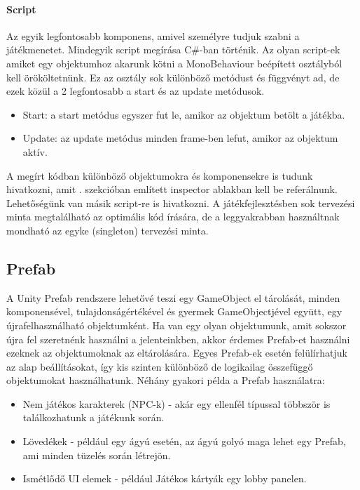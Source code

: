 \documentclass[]{thesis-ekf}
\theoremstyle{definition}
\theoremstyle{remark}
\begin{document}
\paragraph{Script}

Az egyik legfontosabb komponens, amivel személyre tudjuk szabni a játékmenetet. Mindegyik script megírása C\#-ban történik. Az olyan script-ek amiket egy objektumhoz akarunk kötni a MonoBehaviour beépített osztályból kell örököltetnünk. Ez az osztály sok különböző metódust és függvényt ad, de ezek közül a 2 legfontosabb a start és az update metódusok.

\begin{itemize}
	\item Start: a start metódus egyszer fut le, amikor az objektum betölt a játékba.
	\item Update: az update metódus minden frame-ben lefut, amikor az objektum aktív.
\end{itemize}

A megírt kódban különböző objektumokra és komponensekre is tudunk hivatkozni, amit . szekcióban említett inspector ablakban kell be referálnunk. Lehetőségünk van másik script-re is hivatkozni. A játékfejlesztésben sok tervezési minta megtalálható az optimális kód írására, de a leggyakrabban használtnak mondható az egyke (singleton) tervezési minta. \cite{UnityScripting}

\subsection{Prefab}
\label{subsec-prefab}

A Unity Prefab rendszere lehetővé teszi egy GameObject el tárolását, minden komponensével, tulajdonságértékével és gyermek GameObjectjével együtt, egy újrafelhasználható objektumként. Ha van egy olyan objektumunk, amit sokszor újra fel szeretnénk használni a jelenteinkben, akkor érdemes Prefab-et használni ezeknek az objektumoknak az eltárolására. Egyes Prefab-ek esetén felülírhatjuk az alap beállításokat, így kis szinten különböző de logikailag összefüggő objektumokat használhatunk. Néhány gyakori példa a Prefab használatra: \cite{UnityPrefab}

\begin{itemize}
	\item Nem játékos karakterek (NPC-k) - akár egy ellenfél típussal többször is találkozhatunk a játékunk során.
	\item Lövedékek - például egy ágyú esetén, az ágyú golyó maga lehet egy Prefab, ami minden tüzelés során létrejön.
	\item Ismétlődő UI elemek - például Játékos kártyák egy lobby panelen.
\end{itemize}
\end{document}
